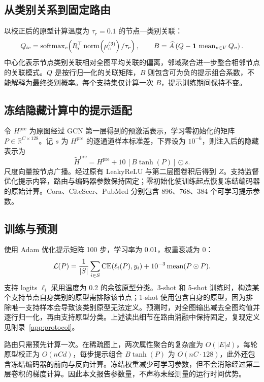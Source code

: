 \subsection{从类别关系到固定路由}
以校正后的原型计算温度为 $\tau_r=0.1$ 的节点—类别关联：
\begin{equation}
Q_{ic}=\operatorname{softmax}_c\!\left(R_i^\top\operatorname{norm}\!\left(\mu_c^{(3)}\right)/\tau_r\right),\qquad
B=\widehat A\left(Q-\mathbf1\,\operatorname{mean}_{v\in V}Q_v\right).
\label{eq:routing}
\end{equation}
中心化表示节点类别关联相对全图平均关联的偏离，邻域聚合进一步整合相邻节点的关联模式。$Q$ 是按行归一化的关联矩阵，$B$ 则包含可为负的提示组合系数，不能解释为最终类别概率。每个支持集仅计算一次 $B$，提示训练期间保持不变。

\subsection{冻结隐藏计算中的提示适配}
令 $H^{\mathrm{pre}}$ 为原图经过 GCN 第一层得到的预激活表示，学习零初始化的矩阵 $P\in\mathbb R^{C\times128}$。记 $s$ 为 $H^{\mathrm{pre}}$ 的逐通道样本标准差，下界设为 $10^{-6}$，则注入后的隐藏表示为
\begin{equation}
\widetilde H^{\mathrm{pre}}=H^{\mathrm{pre}}+10\,[B\tanh(P)]\odot s.
\label{eq:injection}
\end{equation}
尺度向量按节点广播。经过原有 LeakyReLU 与第二层图卷积后得到 $Z$。支持监督优化提示内容，路由与编码器参数保持固定；零初始化使训练起点恢复冻结编码器的原始计算。Cora、CiteSeer、PubMed 分别包含 896、768、384 个可学习提示参数。

\subsection{训练与预测}
使用 Adam 优化提示矩阵 100 步，学习率为 0.01，权重衰减为 0：
\begin{equation}
\mathcal L(P)=\frac{1}{|S|}\sum_{i\in S}\operatorname{CE}(\ell_i(P),y_i)
+10^{-3}\operatorname{mean}(P\odot P).
\label{eq:loss}
\end{equation}
支持 logits $\ell_i$ 采用温度为 0.2 的余弦原型分类。3-shot 和 5-shot 训练时，构造某个支持节点自身类别的原型需排除该节点；1-shot 使用包含自身的原型，因为排除唯一支持样本会导致该类别原型无法定义。预测时，对全图输出减去全图均值并逐行归一化，再由支持原型分类。上述读出细节在路由消融中保持固定，复现定义见附录~\ref{app:protocol}。

路由只需预先计算一次。在稀疏图上，两次属性聚合的复杂度为 $O(|E|d)$，每轮原型校正为 $O(nCd)$，每步提示组合 $B\tanh(P)$ 为 $O(nC\cdot128)$，此外还包含冻结编码器的前向与反向计算。冻结权重减少可学习参数，但不会消除经过第二层卷积的梯度计算。因此本文报告参数量，不声称未经测量的运行时间优势。

